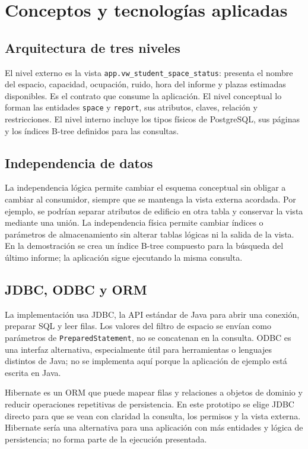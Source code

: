 \documentclass[a4paper,12pt]{article}
\begin{document}
\section{Conceptos y tecnologías aplicadas}
\subsection{Arquitectura de tres niveles}
El nivel externo es la vista \texttt{app.vw\_student\_space\_status}: presenta el nombre del espacio, capacidad, ocupación, ruido, hora del informe y plazas estimadas disponibles. Es el contrato que consume la aplicación. El nivel conceptual lo forman las entidades \texttt{space} y \texttt{report}, sus atributos, claves, relación y restricciones. El nivel interno incluye los tipos físicos de PostgreSQL, sus páginas y los índices B-tree definidos para las consultas.

\subsection{Independencia de datos}
La independencia lógica permite cambiar el esquema conceptual sin obligar a cambiar al consumidor, siempre que se mantenga la vista externa acordada. Por ejemplo, se podrían separar atributos de edificio en otra tabla y conservar la vista mediante una unión. La independencia física permite cambiar índices o parámetros de almacenamiento sin alterar tablas lógicas ni la salida de la vista. En la demostración se crea un índice B-tree compuesto para la búsqueda del último informe; la aplicación sigue ejecutando la misma consulta.

\subsection{JDBC, ODBC y ORM}
La implementación usa JDBC, la API estándar de Java para abrir una conexión, preparar SQL y leer filas. Los valores del filtro de espacio se envían como parámetros de \texttt{PreparedStatement}, no se concatenan en la consulta. ODBC es una interfaz alternativa, especialmente útil para herramientas o lenguajes distintos de Java; no se implementa aquí porque la aplicación de ejemplo está escrita en Java.

Hibernate es un ORM que puede mapear filas y relaciones a objetos de dominio y reducir operaciones repetitivas de persistencia. En este prototipo se elige JDBC directo para que se vean con claridad la consulta, los permisos y la vista externa. Hibernate sería una alternativa para una aplicación con más entidades y lógica de persistencia; no forma parte de la ejecución presentada.
\end{document}
